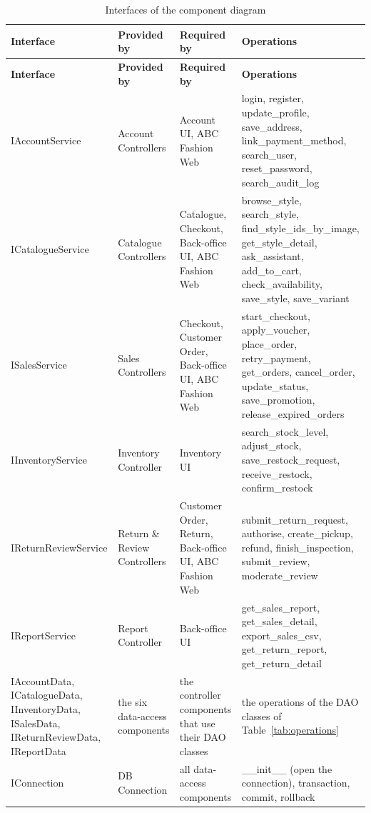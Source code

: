 {\small
\begin{xltabular}{\textwidth}{@{}L{2.9cm} L{2.8cm} L{3.2cm} Y@{}}
\caption{Interfaces of the component diagram}\label{tab:interfaces}\\
\toprule
\textbf{Interface} & \textbf{Provided by} & \textbf{Required by} & \textbf{Operations} \\ \midrule
\endfirsthead
\toprule
\textbf{Interface} & \textbf{Provided by} & \textbf{Required by} & \textbf{Operations} \\ \midrule
\endhead
\bottomrule
\endlastfoot
\textsf{IAccountService} & Account Controllers & Account UI, ABC Fashion Web & login, register, update\_profile, save\_address, link\_payment\_method, search\_user, reset\_password, search\_audit\_log \\
\textsf{ICatalogueService} & Catalogue Controllers & Catalogue, Checkout, Back-office UI, ABC Fashion Web & browse\_style, search\_style, find\_style\_ids\_by\_image, get\_style\_detail, ask\_assistant, add\_to\_cart, check\_availability, save\_style, save\_variant \\
\textsf{ISalesService} & Sales Controllers & Checkout, Customer Order, Back-office UI, ABC Fashion Web & start\_checkout, apply\_voucher, place\_order, retry\_payment, get\_orders, cancel\_order, update\_status, save\_promotion, release\_expired\_orders \\
\textsf{IInventoryService} & Inventory Controller & Inventory UI & search\_stock\_level, adjust\_stock, save\_restock\_request, receive\_restock, confirm\_restock \\
\textsf{IReturnReviewService} & Return \& Review Controllers & Customer Order, Return, Back-office UI, ABC Fashion Web & submit\_return\_request, authorise, create\_pickup, refund, finish\_inspection, submit\_review, moderate\_review \\
\textsf{IReportService} & Report Controller & Back-office UI & get\_sales\_report, get\_sales\_detail, export\_sales\_csv, get\_return\_report, get\_return\_detail \\
\textsf{IAccountData}, \textsf{ICatalogueData}, \textsf{IInventoryData}, \textsf{ISalesData}, \textsf{IReturnReviewData}, \textsf{IReportData} & the six data-access components & the controller components that use their DAO classes & the operations of the DAO classes of Table~\ref{tab:operations} \\
\textsf{IConnection} & DB Connection & all data-access components & \_\_init\_\_ (open the connection), transaction, commit, rollback \\

\end{xltabular}}
